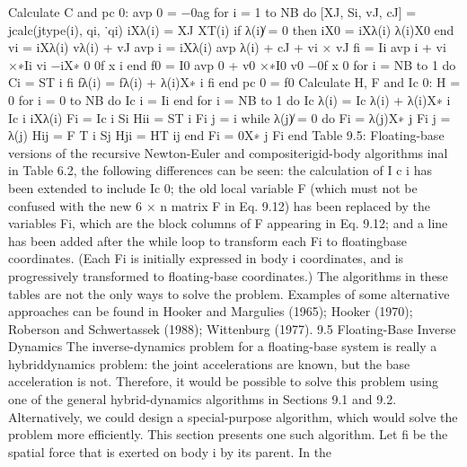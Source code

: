 Calculate C and pc 0: avp 0 = −0ag for i = 1 to NB do [XJ, Si, vJ, cJ] = jcalc(jtype(i), qi, ˙qi) iXλ(i) = XJ XT(i) if λ(i)̸ = 0 then iX0 = iXλ(i) λ(i)X0 end vi = iXλ(i) vλ(i) + vJ avp i = iXλ(i) avp λ(i) + cJ + vi × vJ fi = Ii avp i + vi ×∗Ii vi −iX∗ 0 0f x i end f0 = I0 avp 0 + v0 ×∗I0 v0 −0f x 0 for i = NB to 1 do Ci = ST i fi fλ(i) = fλ(i) + λ(i)X∗ i fi end pc 0 = f0 Calculate H, F and Ic 0: H = 0 for i = 0 to NB do Ic i = Ii end for i = NB to 1 do Ic λ(i) = Ic λ(i) + λ(i)X∗ i Ic i iXλ(i) Fi = Ic i Si Hii = ST i Fi j = i while λ(j)̸ = 0 do Fi = λ(j)X∗ j Fi j = λ(j) Hij = F T i Sj Hji = HT ij end Fi = 0X∗ j Fi end Table 9.5: Floating-base versions of the recursive Newton-Euler and compositerigid-body algorithms inal in Table 6.2, the following differences can be seen: the calculation of I c i has been extended to include Ic 0; the old local variable F (which must not be confused with the new 6 × n matrix F in Eq. 9.12) has been replaced by the variables Fi, which are the block columns of F appearing in Eq. 9.12; and a line has been added after the while loop to transform each Fi to floatingbase coordinates. (Each Fi is initially expressed in body i coordinates, and is progressively transformed to floating-base coordinates.) The algorithms in these tables are not the only ways to solve the problem. Examples of some alternative approaches can be found in Hooker and Margulies (1965); Hooker (1970); Roberson and Schwertassek (1988); Wittenburg (1977). 9.5 Floating-Base Inverse Dynamics The inverse-dynamics problem for a floating-base system is really a hybriddynamics problem: the joint accelerations are known, but the base acceleration is not. Therefore, it would be possible to solve this problem using one of the general hybrid-dynamics algorithms in Sections 9.1 and 9.2. Alternatively, we could design a special-purpose algorithm, which would solve the problem more efficiently. This section presents one such algorithm. Let fi be the spatial force that is exerted on body i by its parent. In the

